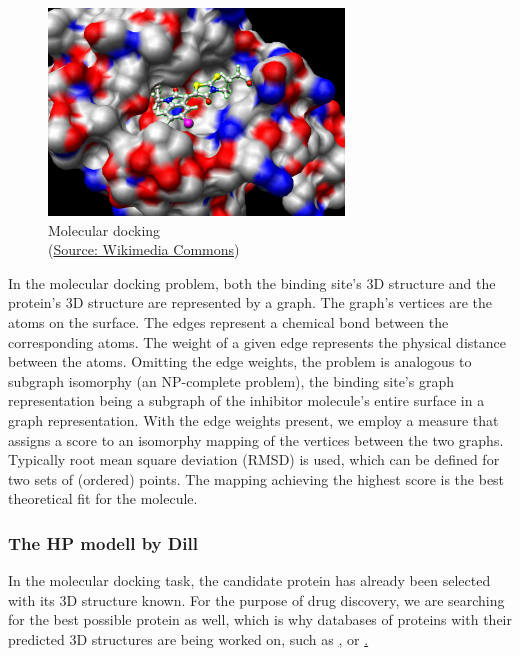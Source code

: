 \begin{figure}[H]
    \centering
    \includegraphics[width=0.7\textwidth]{figures/bioinformatics/molecular_docking.jpg}
    \caption{Molecular docking \\(\href{https://commons.wikimedia.org/wiki/File:Docking.jpg}{Source: Wikimedia Commons})}
\end{figure}

In the molecular docking problem, both the binding site's 3D structure and the protein's 3D structure are represented by a graph. The graph's vertices are the atoms on the surface. The edges represent a chemical bond between the corresponding atoms. The weight of a given edge represents the physical distance between the atoms. Omitting the edge weights, the problem is analogous to subgraph isomorphy (an NP-complete problem), the binding site's graph representation being a subgraph of the inhibitor molecule's entire surface in a graph representation. With the edge weights present, we employ a measure that assigns a score to an isomorphy mapping of the vertices between the two graphs. Typically root mean square deviation (RMSD) is used, which can be defined for two sets of (ordered) points. The mapping achieving the highest score is the best theoretical fit for the molecule.
 \cite{wang_protein_2021}
 
\subsubsection{The HP modell by Dill}

In the molecular docking task, the candidate protein has already been selected with its 3D structure known. For the purpose of drug discovery, we are searching for the best possible protein as well, which is why databases of proteins with their predicted 3D structures are being worked on, such as \href{https://www.uniprot.org/}, or \href{https://alphafold.ebi.ac.uk/}. \cite{senior_improved_2020}

